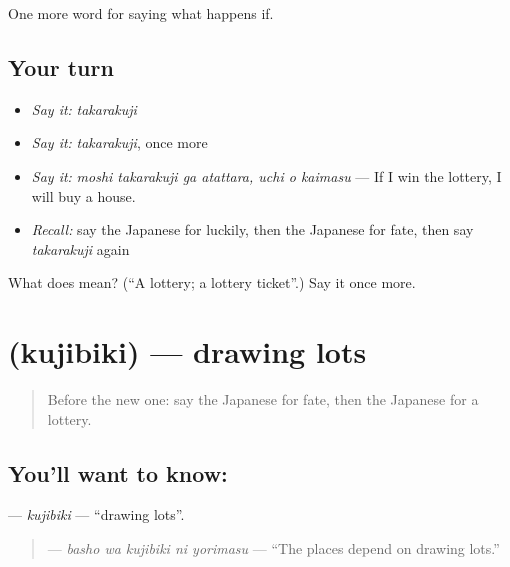 \begin{grammarlens}[title={What you've built}]
One more word for saying what happens if.
\end{grammarlens}

\subsection*{Your turn}
\begin{itemize}
\raggedright
  \item \emph{Say it:} \emph{takarakuji}
  \item \emph{Say it:} \emph{takarakuji}, once more
  \item \emph{Say it:} \emph{moshi takarakuji ga atattara, uchi o kaimasu} — If I win the lottery, I will buy a house.
  \item \emph{Recall:} say the Japanese for luckily, then the Japanese for fate, then say \emph{takarakuji} again
\end{itemize}

\begin{tcolorbox}[breakable,colback=teal!4,colframe=teal!35!black,title={Before you move on}]
What does  mean? (\textquotedblleft{}A lottery; a lottery ticket\textquotedblright{}.) Say it once more.
\end{tcolorbox}
\section[\texorpdfstring{\ja{くじびき} (kujibiki)}{くじびき (kujibiki)}]{ (kujibiki) — drawing lots}

\label{lesson:JA-C509-kujibiki}



\begin{quote}
Before the new one: say the Japanese for fate, then the Japanese for a lottery.
\end{quote}

\subsection*{You'll want to know: }
\textbf{} — \emph{kujibiki} — \textquotedblleft{}drawing lots\textquotedblright{}.

\begin{quote}
\textbf{  } — \emph{basho wa kujibiki ni yorimasu} — \textquotedblleft{}The places depend on drawing lots.\textquotedblright{}
\end{quote}

